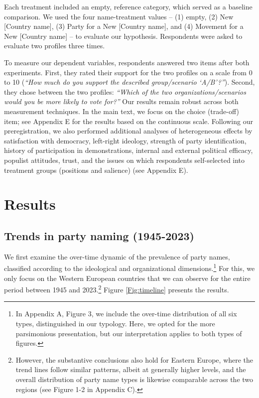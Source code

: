 \documentclass[12pt]{article}
\begin{document}
Each treatment included an empty, reference category, which served as a baseline comparison. We used the four name-treatment values -- (1) empty, (2) New [Country name], (3) Party for a New [Country name], and (4) Movement for a New [Country name] -- to evaluate our hypothesis. Respondents were asked to evaluate two profiles three times.

To measure our dependent variables, respondents answered two items after both experiments. First, they rated their support for the two profiles on a scale from 0 to 10 (\emph{``How much do you support the described group/scenario `A/B'?''}). Second, they chose between the two profiles: \emph{``Which of the two organizations/scenarios would you be more likely to vote for?''} Our results remain robust across both measurement techniques. In the main text, we focus on the choice (trade-off) item; see Appendix E for the results based on the continuous scale. Following our preregistration, we also performed additional analyses of heterogeneous effects by satisfaction with democracy, left-right ideology, strength of party identification, history of participation in demonstrations, internal and external political efficacy, populist attitudes, trust, and the issues on which respondents self-selected into treatment groups (positions and salience) (see Appendix E).

\section{Results}

\subsection{Trends in party naming (1945-2023)}

We first examine the over-time dynamic of the prevalence of party names, classified according to the ideological and organizational dimensions.\footnote{In Appendix A, Figure 3, we include the over-time distribution of all six types, distinguished in our typology. Here, we opted for the more parsimonious presentation, but our interpretation applies to both types of figures.} For this, we only focus on the Western European countries that we can observe for the entire period between 1945 and 2023.\footnote{However, the substantive conclusions also hold for Eastern Europe, where the trend lines follow similar patterns, albeit at generally higher levels, and the overall distribution of party name types is likewise comparable across the two regions (see Figure 1-2 in Appendix C).} Figure \ref{Fig:timeline} presents the results.
\end{document}
